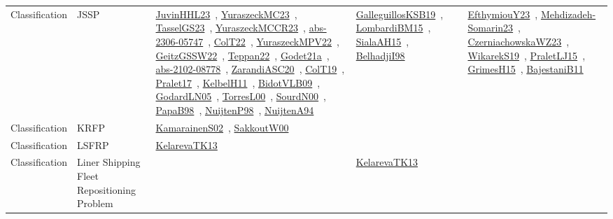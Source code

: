 {\begin{longtable}{lp{3cm}>{\raggedright\arraybackslash}p{6cm}>{\raggedright\arraybackslash}p{6cm}>{\raggedright\arraybackslash}p{8cm}}
Classification & JSSP & \href{works/JuvinHHL23.pdf}{JuvinHHL23}~\cite{JuvinHHL23}, \href{works/YuraszeckMC23.pdf}{YuraszeckMC23}~\cite{YuraszeckMC23}, \href{works/TasselGS23.pdf}{TasselGS23}~\cite{TasselGS23}, \href{works/YuraszeckMCCR23.pdf}{YuraszeckMCCR23}~\cite{YuraszeckMCCR23}, \href{works/abs-2306-05747.pdf}{abs-2306-05747}~\cite{abs-2306-05747}, \href{works/ColT22.pdf}{ColT22}~\cite{ColT22}, \href{works/YuraszeckMPV22.pdf}{YuraszeckMPV22}~\cite{YuraszeckMPV22}, \href{works/GeitzGSSW22.pdf}{GeitzGSSW22}~\cite{GeitzGSSW22}, \href{works/Teppan22.pdf}{Teppan22}~\cite{Teppan22}, \href{works/Godet21a.pdf}{Godet21a}~\cite{Godet21a}, \href{works/abs-2102-08778.pdf}{abs-2102-08778}~\cite{abs-2102-08778}, \href{works/ZarandiASC20.pdf}{ZarandiASC20}~\cite{ZarandiASC20}, \href{works/ColT19.pdf}{ColT19}~\cite{ColT19}, \href{works/Pralet17.pdf}{Pralet17}~\cite{Pralet17}, \href{works/KelbelH11.pdf}{KelbelH11}~\cite{KelbelH11}, \href{works/BidotVLB09.pdf}{BidotVLB09}~\cite{BidotVLB09}, \href{works/GodardLN05.pdf}{GodardLN05}~\cite{GodardLN05}, \href{works/TorresL00.pdf}{TorresL00}~\cite{TorresL00}, \href{works/SourdN00.pdf}{SourdN00}~\cite{SourdN00}, \href{works/PapaB98.pdf}{PapaB98}~\cite{PapaB98}, \href{works/NuijtenP98.pdf}{NuijtenP98}~\cite{NuijtenP98}, \href{works/NuijtenA94.pdf}{NuijtenA94}~\cite{NuijtenA94} & \href{works/GalleguillosKSB19.pdf}{GalleguillosKSB19}~\cite{GalleguillosKSB19}, \href{works/LombardiBM15.pdf}{LombardiBM15}~\cite{LombardiBM15}, \href{works/SialaAH15.pdf}{SialaAH15}~\cite{SialaAH15}, \href{works/BelhadjiI98.pdf}{BelhadjiI98}~\cite{BelhadjiI98} & \href{works/EfthymiouY23.pdf}{EfthymiouY23}~\cite{EfthymiouY23}, \href{works/Mehdizadeh-Somarin23.pdf}{Mehdizadeh-Somarin23}~\cite{Mehdizadeh-Somarin23}, \href{works/CzerniachowskaWZ23.pdf}{CzerniachowskaWZ23}~\cite{CzerniachowskaWZ23}, \href{works/WikarekS19.pdf}{WikarekS19}~\cite{WikarekS19}, \href{works/PraletLJ15.pdf}{PraletLJ15}~\cite{PraletLJ15}, \href{works/GrimesH15.pdf}{GrimesH15}~\cite{GrimesH15}, \href{works/BajestaniB11.pdf}{BajestaniB11}~\cite{BajestaniB11}\\
Classification & KRFP & \href{works/KamarainenS02.pdf}{KamarainenS02}~\cite{KamarainenS02}, \href{works/SakkoutW00.pdf}{SakkoutW00}~\cite{SakkoutW00} &  & \\
Classification & LSFRP & \href{works/KelarevaTK13.pdf}{KelarevaTK13}~\cite{KelarevaTK13} &  & \\
Classification & Liner Shipping Fleet Repositioning Problem &  & \href{works/KelarevaTK13.pdf}{KelarevaTK13}~\cite{KelarevaTK13} & \\

\end{longtable}}
